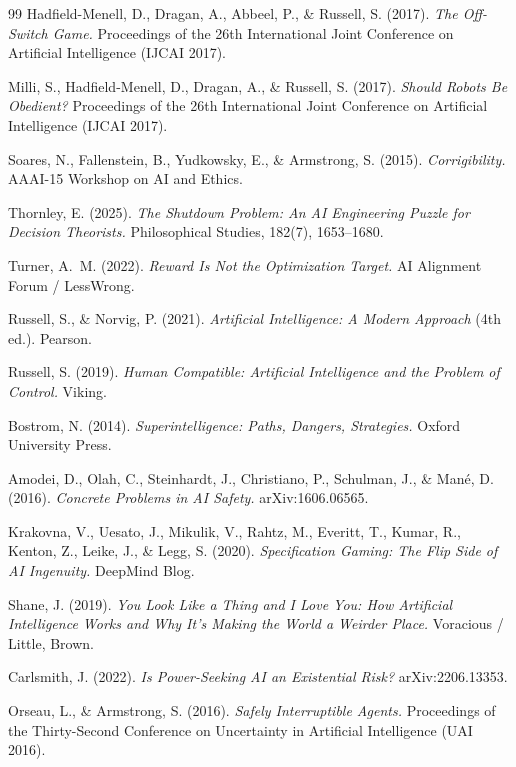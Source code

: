 \documentclass[11pt]{article}
\theoremstyle{definition}
\begin{document}
\begin{thebibliography}{99}
Hadfield-Menell, D., Dragan, A., Abbeel, P., \& Russell, S. (2017). \emph{The Off-Switch Game.} Proceedings of the 26th International Joint Conference on Artificial Intelligence (IJCAI 2017).

Milli, S., Hadfield-Menell, D., Dragan, A., \& Russell, S. (2017). \emph{Should Robots Be Obedient?} Proceedings of the 26th International Joint Conference on Artificial Intelligence (IJCAI 2017).

Soares, N., Fallenstein, B., Yudkowsky, E., \& Armstrong, S. (2015). \emph{Corrigibility.} AAAI-15 Workshop on AI and Ethics.

Thornley, E. (2025). \emph{The Shutdown Problem: An AI Engineering Puzzle for Decision Theorists.} Philosophical Studies, 182(7), 1653--1680.

Turner, A.~M. (2022). \emph{Reward Is Not the Optimization Target.} AI Alignment Forum / LessWrong.

Russell, S., \& Norvig, P. (2021). \emph{Artificial Intelligence: A Modern Approach} (4th ed.). Pearson.

Russell, S. (2019). \emph{Human Compatible: Artificial Intelligence and the Problem of Control.} Viking.

Bostrom, N. (2014). \emph{Superintelligence: Paths, Dangers, Strategies.} Oxford University Press.

Amodei, D., Olah, C., Steinhardt, J., Christiano, P., Schulman, J., \& Man\'e, D. (2016). \emph{Concrete Problems in AI Safety.} arXiv:1606.06565.

Krakovna, V., Uesato, J., Mikulik, V., Rahtz, M., Everitt, T., Kumar, R., Kenton, Z., Leike, J., \& Legg, S. (2020). \emph{Specification Gaming: The Flip Side of AI Ingenuity.} DeepMind Blog.

Shane, J. (2019). \emph{You Look Like a Thing and I Love You: How Artificial Intelligence Works and Why It's Making the World a Weirder Place.} Voracious / Little, Brown.

Carlsmith, J. (2022). \emph{Is Power-Seeking AI an Existential Risk?} arXiv:2206.13353.

Orseau, L., \& Armstrong, S. (2016). \emph{Safely Interruptible Agents.} Proceedings of the Thirty-Second Conference on Uncertainty in Artificial Intelligence (UAI 2016).


\end{thebibliography}
\end{document}
